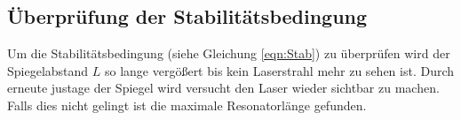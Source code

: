 \subsection{Überprüfung der Stabilitätsbedingung}
Um die Stabilitätsbedingung (siehe Gleichung \eqref{eqn:Stab}) zu überprüfen wird der Spiegelabstand $L$ so lange vergößert bis kein Laserstrahl mehr zu sehen ist. Durch erneute justage der Spiegel wird versucht den Laser wieder sichtbar zu machen. Falls dies nicht gelingt ist die maximale Resonatorlänge gefunden.
